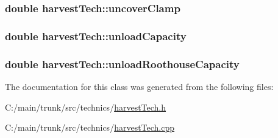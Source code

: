 \label{classharvest_tech_a390dbcd08cb961378c244a52b550bd70}
\hypertarget{classharvest_tech_a63be74e621105c9148ca2f98edb29fb8}{
\subsubsection[{uncoverClamp}]{\setlength{\rightskip}{0pt plus 5cm}double {\bf harvestTech::uncoverClamp}}}
\label{classharvest_tech_a63be74e621105c9148ca2f98edb29fb8}
\hypertarget{classharvest_tech_ad7098f90d7fbb9d02a12dad4714de781}{
\subsubsection[{unloadCapacity}]{\setlength{\rightskip}{0pt plus 5cm}double {\bf harvestTech::unloadCapacity}}}
\label{classharvest_tech_ad7098f90d7fbb9d02a12dad4714de781}
\hypertarget{classharvest_tech_ad73c0def5ee037378be9afcee7cfbf72}{
\subsubsection[{unloadRoothouseCapacity}]{\setlength{\rightskip}{0pt plus 5cm}double {\bf harvestTech::unloadRoothouseCapacity}}}
\label{classharvest_tech_ad73c0def5ee037378be9afcee7cfbf72}


The documentation for this class was generated from the following files:\begin{DoxyCompactItemize}
\item 
C:/main/trunk/src/technics/\hyperlink{harvest_tech_8h}{harvestTech.h}\item 
C:/main/trunk/src/technics/\hyperlink{harvest_tech_8cpp}{harvestTech.cpp}\end{DoxyCompactItemize}
